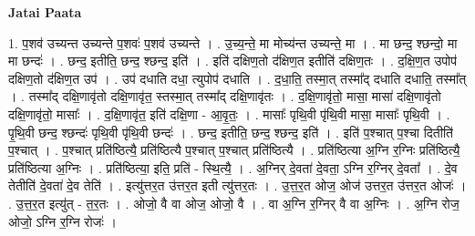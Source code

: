 \documentclass[17pt]{extarticle}
\begin{document}
\textbf{Jatai Paata} \newline

1. प॒शव॑ उच्यन्त उच्यन्ते प॒शवः॑ प॒शव॑ उच्यन्ते । . उ॒च्य॒न्ते॒ मा मोच्य॑न्त उच्यन्ते॒ मा । . मा छन्द॒ श्छन्दो॒ मा मा छन्दः॑ । . छन्द॒ इतीति॒ छन्द॒ श्छन्द॒ इति॑ । . इति॑ दक्षिण॒तो द॑क्षिण॒त इतीति॑ दक्षिण॒तः । . द॒क्षि॒ण॒त उपोप॑ दक्षिण॒तो द॑क्षिण॒त उप॑ । . उप॑ दधाति दधा॒ त्युपोप॑ दधाति । . द॒धा॒ति॒ तस्मा॒त् तस्मा᳚द् दधाति दधाति॒ तस्मा᳚त् । . तस्मा᳚द् दक्षि॒णावृ॑तो दक्षि॒णावृ॑त॒ स्तस्मा॒त् तस्मा᳚द् दक्षि॒णावृ॑तः । . द॒क्षि॒णावृ॑तो॒ मासा॒ मासा॑ दक्षि॒णावृ॑तो दक्षि॒णावृ॑तो॒ मासाः᳚ । . द॒क्षि॒णावृ॑त॒ इति॑ दक्षि॒णा - आ॒वृ॒तः॒ । . मासाः᳚ पृथि॒वी पृ॑थि॒वी मासा॒ मासाः᳚ पृथि॒वी । . पृ॒थि॒वी छन्द॒ श्छन्दः॑ पृथि॒वी पृ॑थि॒वी छन्दः॑ । . छन्द॒ इतीति॒ छन्द॒ श्छन्द॒ इति॑ । . इति॑ प॒श्चात् प॒श्चा दितीति॑ प॒श्चात् । . प॒श्चात् प्रति॑ष्ठित्यै॒ प्रति॑ष्ठित्यै प॒श्चात् प॒श्चात् प्रति॑ष्ठित्यै । . प्रति॑ष्ठित्या अ॒ग्नि र॒ग्निः प्रति॑ष्ठित्यै॒ प्रति॑ष्ठित्या अ॒ग्निः । . प्रति॑ष्ठित्या॒ इति॒ प्रति॑ - स्थि॒त्यै॒ । . अ॒ग्निर् दे॒वता॑ दे॒वता॒ ऽग्नि र॒ग्निर् दे॒वता᳚ । . दे॒व तेतीति॑ दे॒वता॑ दे॒व तेति॑ । . इत्यु॑त्तर॒त उ॑त्तर॒त इती त्यु॑त्तर॒तः । . उ॒त्त॒र॒त ओज॒ ओज॑ उत्तर॒त उ॑त्तर॒त ओजः॑ । . उ॒त्त॒र॒त इत्यु॑त् - त॒र॒तः । . ओजो॒ वै वा ओज॒ ओजो॒ वै । . वा अ॒ग्नि र॒ग्निर् वै वा अ॒ग्निः । . अ॒ग्नि रोज॒ ओजो॒ ऽग्नि र॒ग्नि रोजः॑ । \newline
\end{document}
